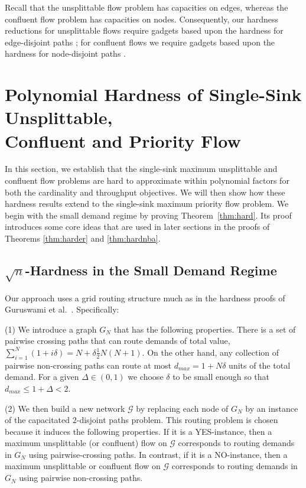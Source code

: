 \documentclass[12pt]{article}
\begin{document}
Recall that the unsplittable flow problem has capacities on edges, whereas
the confluent flow problem has capacities on nodes.
Consequently, our hardness reductions for
unsplittable flows  require gadgets based upon
the hardness for edge-disjoint paths \cite{naves2010maximum};
for confluent flows we  require gadgets based upon
the hardness for node-disjoint paths \cite{guruswami2003near}.







\section{Polynomial Hardness of Single-Sink Unsplittable,\\ Confluent and Priority Flow}
\label{sec:lower}


In this section, we establish that the single-sink maximum unsplittable and confluent flow problems
are hard to approximate within polynomial factors for both the cardinality and throughput objectives.
We will then show how these hardness results extend to the single-sink maximum priority flow problem.
We begin with the small demand regime by proving Theorem~\ref{thm:hard}.
Its proof introduces some core ideas that are used in later sections
in the proofs of Theorems \ref{thm:harder} and \ref{thm:hardnba}.






\subsection{$\sqrt{n}$-Hardness in the Small Demand Regime}
\label{sec:hardness}



Our approach uses a grid routing structure much as in the hardness proofs of Guruswami et al.~\cite{guruswami2003near}.
Specifically:

(1) We introduce a graph $G_N$ that has the following properties.
There is a set of pairwise crossing paths that can route demands of total value,
$\sum_{i=1}^{N} (1+ i \delta) =N + \delta \frac12 N(N+1)$.  On the other hand, any collection of pairwise non-crossing
paths can route at most $d_{max} = 1+N\delta$ units of the total demand. For a given  $\Delta \in (0,1)$ we
choose $\delta$ to be small enough so that $d_{max} \leq 1+\Delta < 2$.

(2) We then build a new network $\mathcal{G}$ by replacing each node of $G_N$ by
an instance of the capacitated $2$-disjoint paths problem. This routing problem is chosen
because it induces the following properties.  If it is a YES-instance, then a maximum unsplittable (or confluent) flow on
$\mathcal{G}$ corresponds to routing demands in $G_N$ using pairwise-crossing paths. In contrast, if it is a
NO-instance, then a maximum unsplittable or confluent flow on $\mathcal{G}$  corresponds to routing
demands in $G_N$ using pairwise non-crossing paths.
\end{document}
